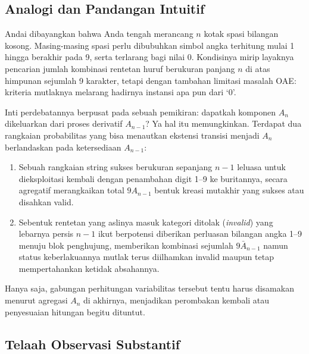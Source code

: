 \documentclass[12pt,a4paper]{article}
\theoremstyle{definition}
\begin{document}
\subsection{Analogi dan Pandangan Intuitif}

Andai dibayangkan bahwa Anda tengah merancang $n$ kotak spasi bilangan kosong.
Masing-masing spasi perlu dibubuhkan simbol angka terhitung mulai 1 hingga
berakhir pada 9, serta terlarang bagi nilai 0. Kondisinya mirip layaknya
pencarian jumlah kombinasi rentetan huruf berukuran panjang $n$ di atas
himpunan sejumlah 9 karakter, tetapi dengan tambahan limitasi masalah OAE: 
kriteria mutlaknya melarang hadirnya instansi apa pun dari `0'.

\begin{keyinsight}
  Inti perdebatannya berpusat pada sebuah pemikiran: dapatkah komponen $A_n$ 
  dikeluarkan dari proses derivatif $A_{n-1}$? Ya hal itu memungkinkan. Terdapat
  dua rangkaian probabilitas yang bisa menautkan ekstensi transisi menjadi $A_n$
  berlandaskan pada ketersediaan $A_{n-1}$:
  \begin{enumerate}
    \item Sebuah rangkaian string sukses berukuran sepanjang $n-1$ leluasa untuk 
          dieksploitasi kembali dengan penambahan digit 1--9 ke buritannya,
          secara agregatif merangkaikan total $9A_{n-1}$ bentuk kreasi mutakhir
          yang sukses atau disahkan valid.
    \item Sebentuk rentetan yang aslinya masuk kategori ditolak (\emph{invalid}) 
          yang lebarnya persis $n-1$ ikut berpotensi diberikan perluasan bilangan
          angka 1--9 menuju blok penghujung, memberikan kombinasi sejumlah 
          $9\bar{A}_{n-1}$ namun status keberlakuannya mutlak terus diilhamkan
          invalid maupun tetap mempertahankan ketidak absahannya.
  \end{enumerate}
  Hanya saja, gabungan perhitungan variabilitas tersebut tentu harus disamakan
  menurut agregasi $A_n$ di akhirnya, menjadikan perombakan kembali atau
  penyesuaian hitungan begitu dituntut.
\end{keyinsight}

\subsection{Telaah Observasi Substantif}
\end{document}
